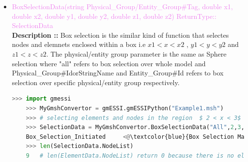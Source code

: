 \documentclass[11pt]{article}
\begin{document}
\begin{itemize}
    \item \textcolor{violet}{ BoxSelectionData(string Physical\_Group/Entity\_Group\#Tag,  double x1, double x2, double y1, double y2, double z1, double z2) \hfill {ReturnType:: SelectionData}} \\
    \textbf{Description ::} Box selection is the similar kind of function that selectes nodes and elemnets enclosed within a box i.e  $x1 < x < x2$ , $y1 < y < y2$  and $z1 < z < z2$. The physical/entity group parameter is the same as Sphere selection where "all" refers to box selection over whole model and  Physical\_Group\#IdorStringName and Entity\_Group\#Id refers to box selection over specific physical/entity group respectively.
    \begin{lstlisting}[language=Python]
    >>> import gmessi
    >>> MyGmshConvertor = gmESSI.gmESSIPython("Example1.msh")
    >>> # selecting elements and nodes in the region  $ 2 < x < 3$ , $0 < y < 1$  and $0 < z < 1$ on all model 
    >>> SelectionData = MyGmshConvertor.BoxSelectionData("All",2,3,0,1,0,1)
    Box_Selection_Initiated     <@\textcolor{blue}{Box Selection Made over All Model with 2 < x_cord < 3 , 0 < y_cord < 1 and 0< z_cord < 1}@> 
    >>> len(SelectionData.NodeList)
    9   # len(ElementData.NodeList) return 0 because there is no element bounded inside that region
    \end{lstlisting}


\end{itemize}
\end{document}
